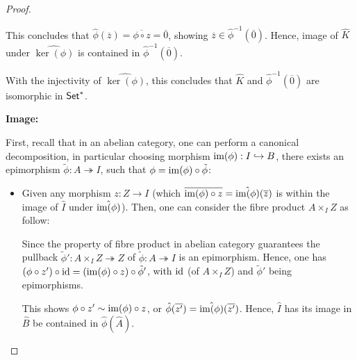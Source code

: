 \documentclass{article}
\begin{document}
\begin{proof}
\begin{itemize}
        This concludes that $\hat{\phi}(\overline{z})= \overline{\phi\circ z}=\overline{0}$, showing $\overline{z} \in \hat{\phi}^{-1}(\overline{0})$. Hence, image of $\hat{K}$ under $\hat{\ker(\phi)}$ is contained in $\hat{\phi}^{-1}(\overline{0})$.
    \end{itemize}

    With the injectivity of $\hat{\ker(\phi)}$, this concludes that $\hat{K}$ and $\hat{\phi}^{-1}(\overline{0})$ are isomorphic in $\mathsf{Set}^*$.

    \hfil

    \textbf{Image:}
    
    First, recall that in an abelian category, one can perform a canonical decomposition, in particular choosing morphism $\mathrm{im}(\phi):I\hookrightarrow B$, there exists an epimorphism $\tilde{\phi}:A\twoheadrightarrow I$, such that $\phi = \mathrm{im}(\phi)\circ \tilde{\phi}$:
    \begin{center}
    \end{center}
    \begin{itemize}
        \item[$\subseteq$:] Given any morphism $z:Z\rightarrow I$ (which $\overline{\mathrm{im}(\phi)\circ z} = \hat{\mathrm{im}(\phi)}(\overline{z})$ is within the image of $\hat{I}$ under $\hat{\mathrm{im}(\phi)}$). Then, one can consider the fibre product $A\times_I Z$ as follow:
        \begin{center}
        \end{center}
        Since the property of fibre product in abelian category guarantees the pullback $\tilde{\phi}':A\times_I Z\twoheadrightarrow Z$ of $\tilde{\phi}:A\twoheadrightarrow I$ is an epimorphism. Hence, one has $(\phi\circ z')\circ \mathrm{id} = (\mathrm{im}(\phi)\circ z)\circ \tilde{\phi}'$, with $\mathrm{id}$ (of $A\times_I Z$) and $\tilde{\phi}'$ being epimorphisms.

        This shows $\phi\circ z'\sim \mathrm{im}(\phi)\circ z$, or $\hat{\phi}(\overline{z'}) = \hat{\mathrm{im}(\phi)}(\overline{z'})$. Hence, $\hat{I}$ has its image in $\hat{B}$ be contained in $\hat{\phi}(\hat{A})$.


\end{itemize}
\end{proof}
\end{document}
